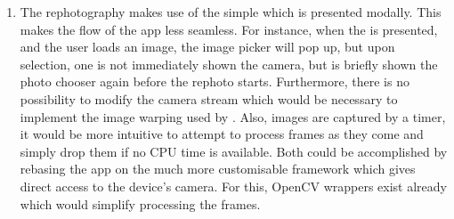 \begin{enumerate}
   \item The rephotography makes use of the simple
       which is presented modally. This makes the
      flow of the app less seamless. For instance, when the
       is presented, and the user loads an image,
      the image picker will pop up, but upon selection, one is not immediately
      shown the camera, but is briefly shown the photo chooser again before the
      rephoto starts. Furthermore, there is no possibility to modify the camera
      stream which would be necessary to implement the image warping used by
      \citet{bae2010}. Also, images are captured by a timer, it would be more
      intuitive to attempt to process frames as they come and simply drop them
      if no CPU time is available. Both could be accomplished by rebasing the
      app on the much more customisable  framework which
      gives direct access to the device's camera. For this, OpenCV wrappers
      exist already which would simplify processing the frames.
\end{enumerate}

